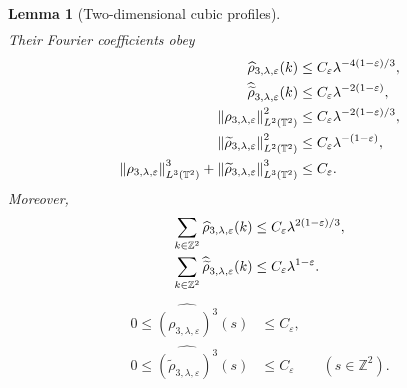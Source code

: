 \documentclass[12pt,reqno,letterpaper]{amsart}
\numberwithin{equation}{section}
\newtheorem{lemma}[theorem]{Lemma}
\theoremstyle{definition}
\newcommand{\T}{\mathbb T}
\newcommand{\Z}{\mathbb Z}
\newcommand{\eps}{\varepsilon}
\newcommand{\la}{\lambda}
\newcommand{\norm}[1]{\left\lVert #1\right\rVert}
\begin{document}
\begin{lemma}[Two-dimensional cubic profiles]
\begin{align}
\end{align}
Their Fourier coefficients obey
\begin{align}
 \widehat\rho_{3,\la,\eps}(k)
 &\leq C_\eps\la^{-4(1-\eps)/3},\notag\\
 \widehat{\widetilde{\rho}}_{3,\la,\eps}(k)
 &\leq C_\eps\la^{-2(1-\eps)},
 \label{eq:cubic-profile-coefficient-bound}\\
 \norm{\rho_{3,\la,\eps}}_{L^2(\T^2)}^2
 &\leq C_\eps\la^{-2(1-\eps)/3},\notag\\
 \norm{\widetilde{\rho}_{3,\la,\eps}}_{L^2(\T^2)}^2
 &\leq C_\eps\la^{-(1-\eps)},\notag\\
 \norm{\rho_{3,\la,\eps}}_{L^3(\T^2)}^3
 +\norm{\widetilde{\rho}_{3,\la,\eps}}_{L^3(\T^2)}^3
 &\leq C_\eps.
 \label{eq:cubic-profile-endpoints}
\end{align}
Moreover,
\begin{align}
 \sum_{k\in\Z^2}\widehat\rho_{3,\la,\eps}(k)
 &\leq C_\eps\la^{2(1-\eps)/3},\notag\\
 \sum_{k\in\Z^2}\widehat{\widetilde{\rho}}_{3,\la,\eps}(k)
 &\leq C_\eps\la^{1-\eps}.
 \label{eq:cubic-profile-Fourier-mass}
\end{align}
\begin{equation}
\begin{aligned}
 0\leq\widehat{(\rho_{3,\la,\eps})^3}(s)
 &\leq C_\eps,\\
 0\leq\widehat{(\widetilde{\rho}_{3,\la,\eps})^3}(s)
 &\leq C_\eps
 \qquad(s\in\Z^2).
\end{aligned}
\label{eq:cubic-profile-cubic-coefficient-bound}
\end{equation}
\end{lemma}
\end{document}
